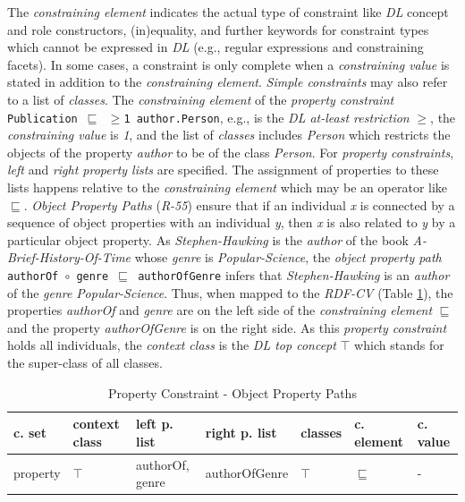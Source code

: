 \documentclass[a4paper,fontsize=11pt]{scrartcl}
\newcommand{\ms}[1]{\texttt{#1}}
\begin{document}
The \emph{constraining element} indicates the actual type of constraint like \emph{DL} concept and role constructors, (in)equality, and further keywords for constraint types which cannot be expressed in \emph{DL} (e.g., regular expressions and constraining facets).
In some cases, a constraint is only complete when a \emph{constraining value} is stated in addition to the \emph{constraining element}.
\emph{Simple constraints} may also refer to a list of \emph{classes}.
The \emph{constraining element} of the \emph{property constraint} {\small\ms{Publication $\sqsubseteq$ $\geq$1 author.Person},} e.g.,  is the \emph{DL at-least restriction} \emph{$\geq$}, the \emph{constraining value} is \emph{1}, and
the list of \emph{classes} includes \emph{Person} which restricts the objects of the property \emph{author} to be of the class \emph{Person}.
For \emph{property constraints}, \emph{left} and \emph{right property lists} are specified.
The assignment of properties to these lists happens relative to the \emph{constraining element} 
which may be an operator like $\sqsubseteq$.
\emph{Object Property Paths} (\emph{R-55})
ensure that if an individual \emph{x} is connected by a sequence of object properties with an individual \emph{y}, 
then \emph{x} is also related to \emph{y} by a particular object property. 
As \emph{Stephen-Hawking} is the \emph{author} of the book \emph{A-Brief-History-Of-Time} 
whose \emph{genre} is \emph{Popular-Science}, 
the \emph{object property path} {\small\ms{authorOf $\circ$ genre $\sqsubseteq$ authorOfGenre}} infers that \emph{Stephen-Hawking} is an \emph{author} of the \emph{genre} \emph{Popular-Science}. 
Thus, when mapped to the \emph{RDF-CV} (Table \ref{tab:property-constraint-object-property-paths}), the properties \emph{authorOf} and \emph{genre} are on the left side of the \emph{constraining element} \emph{$\sqsubseteq$}
and the property \emph{authorOfGenre} is on the right side.
As this \emph{property constraint} holds all individuals, the \emph{context class} is the \emph{DL top concept} $\top$ which stands for the super-class of all classes.
\begin{table}[H]
  \scriptsize
  \sffamily
  \vspace{0cm}
	\caption{Property Constraint - Object Property Paths}
	\label{tab:property-constraint-object-property-paths}
	\centering
		\begin{tabular}{l|l|l|l|l|l|l}
      \textbf{c. set} & \textbf{context class} & \textbf{left p. list} & \textbf{right p. list} & \textbf{classes} & \textbf{c. element} & \textbf{c. value} \\
      \hline
      property & $\top$ & authorOf, genre & authorOfGenre & $\top$ & $\sqsubseteq$ & - \\
		\end{tabular}
\end{table}
\end{document}
